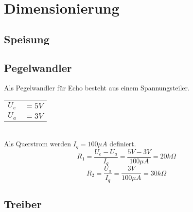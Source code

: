 



\section{Dimensionierung}

\subsection{Speisung}

\subsection{Pegelwandler}
Als Pegelwandler für Echo besteht aus einem Spannungsteiler. \\
\begin{tabular}{@{}ll}
  $U_e$ & $= 5 V$ \\
  $U_a$ & $= 3 V$ \\
\end{tabular} \\
Als Querstrom werden $I_q = 100 \mu A$ definiert. 
\[ R_1 = \frac{U_e - U_a}{I_q} = \frac{5 V - 3 V}{100 \mu A} = 20 k\Omega \]
\[ R_2 = \frac{U_a}{I_q} = \frac{3 V}{100 \mu A} = 30 k\Omega \]

\subsection{Treiber}
